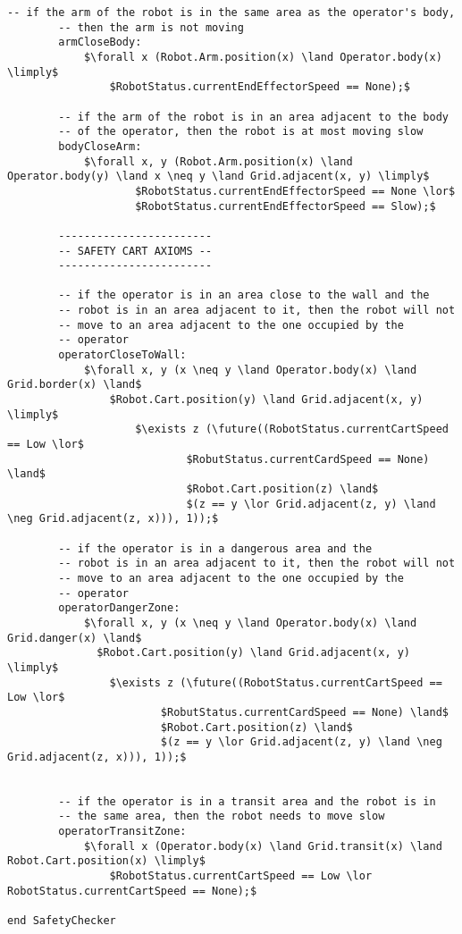 \begin{lstlisting}[fontadjust, mathescape, frame=single]
        -- if the arm of the robot is in the same area as the operator's body,
        -- then the arm is not moving
        armCloseBody:
            $\forall x (Robot.Arm.position(x) \land Operator.body(x) \limply$
                $RobotStatus.currentEndEffectorSpeed == None);$

        -- if the arm of the robot is in an area adjacent to the body
        -- of the operator, then the robot is at most moving slow
        bodyCloseArm:
            $\forall x, y (Robot.Arm.position(x) \land Operator.body(y) \land x \neq y \land Grid.adjacent(x, y) \limply$
                    $RobotStatus.currentEndEffectorSpeed == None \lor$
                    $RobotStatus.currentEndEffectorSpeed == Slow);$

        ------------------------       
        -- SAFETY CART AXIOMS --
        ------------------------

        -- if the operator is in an area close to the wall and the
        -- robot is in an area adjacent to it, then the robot will not
        -- move to an area adjacent to the one occupied by the
        -- operator
        operatorCloseToWall:
            $\forall x, y (x \neq y \land Operator.body(x) \land Grid.border(x) \land$
                $Robot.Cart.position(y) \land Grid.adjacent(x, y) \limply$
                    $\exists z (\future((RobotStatus.currentCartSpeed == Low \lor$
                            $RobutStatus.currentCardSpeed == None) \land$
                            $Robot.Cart.position(z) \land$
                            $(z == y \lor Grid.adjacent(z, y) \land \neg Grid.adjacent(z, x))), 1));$

        -- if the operator is in a dangerous area and the
        -- robot is in an area adjacent to it, then the robot will not
        -- move to an area adjacent to the one occupied by the
        -- operator
        operatorDangerZone:
            $\forall x, y (x \neq y \land Operator.body(x) \land Grid.danger(x) \land$
              $Robot.Cart.position(y) \land Grid.adjacent(x, y) \limply$
                $\exists z (\future((RobotStatus.currentCartSpeed == Low \lor$
                        $RobutStatus.currentCardSpeed == None) \land$
                        $Robot.Cart.position(z) \land$
                        $(z == y \lor Grid.adjacent(z, y) \land \neg Grid.adjacent(z, x))), 1));$


        -- if the operator is in a transit area and the robot is in
        -- the same area, then the robot needs to move slow
        operatorTransitZone:
            $\forall x (Operator.body(x) \land Grid.transit(x) \land Robot.Cart.position(x) \limply$
                $RobotStatus.currentCartSpeed == Low \lor RobotStatus.currentCartSpeed == None);$

end SafetyChecker                
\end{lstlisting}